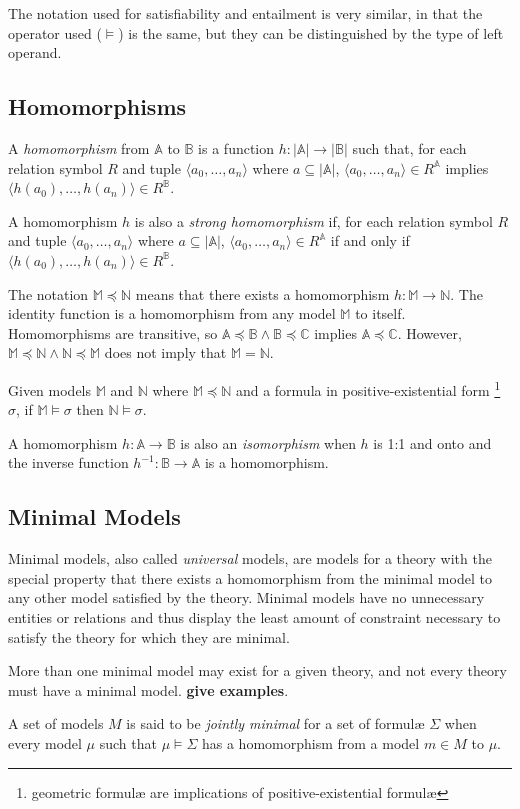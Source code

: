 		The notation used for satisfiability and entailment is very similar, in
		that the operator used ($\models$) is the same, but they can be
		distinguished by the type of left operand.

	\subsection{Homomorphisms}

		A \emph{homomorphism} from $\mathbb{A}$ to $\mathbb{B}$ is a function
		$h: |\mathbb{A}|\to|\mathbb{B}|$ such that, for each relation symbol
		$R$ and tuple $\langle a_0 , \ldots , a_n \rangle$ where $a \subseteq
		|\mathbb{A}|$, $\langle a_0 , \ldots , a_n  \rangle \in R^\mathbb{A}$
		implies $\langle h(a_0) , \ldots , h(a_n) \rangle \in R^\mathbb{B}$.

		A homomorphism $h$ is also a \emph{strong homomorphism} if, for each
		relation symbol $R$ and tuple $\langle a_0 , \ldots , a_n \rangle$
		where $a \subseteq |\mathbb{A}|$, $\langle a_0 , \ldots , a_n  \rangle
		\in R^\mathbb{A}$ if and only if $\langle h(a_0) , \ldots , h(a_n)
		\rangle \in R^\mathbb{B}$.

		The notation $\mathbb{M} \preceq \mathbb{N}$ means that there exists a
		homomorphism $h : \mathbb{M} \to \mathbb{N}$. The identity function is
		a homomorphism from any model $\mathbb{M}$ to itself.  Homomorphisms
		are transitive, so $\mathbb{A} \preceq \mathbb{B} \wedge \mathbb{B}
		\preceq \mathbb{C}$ implies $\mathbb{A} \preceq \mathbb{C}$. However,
		$\mathbb{M} \preceq \mathbb{N} \wedge \mathbb{N} \preceq \mathbb{M}$
		does not imply that $\mathbb{M} = \mathbb{N}$.

		Given models $\mathbb{M}$ and $\mathbb{N}$ where $\mathbb{M} \preceq
		\mathbb{N}$ and a formula in positive-existential form
		\footnote{geometric formul{\ae} are implications of positive-existential
		formul{\ae}} $\sigma$, if $\mathbb{M} \models \sigma$ then $\mathbb{N}
		\models \sigma$.

		A homomorphism $h : \mathbb{A} \to \mathbb{B}$ is also an
		\emph{isomorphism} when $h$ is 1:1 and onto and the inverse function
		$h^{-1} : \mathbb{B} \to \mathbb{A}$ is a homomorphism.

	\subsection{Minimal Models}

		Minimal models, also called \emph{universal} models, are models for a
		theory with the special property that there exists a homomorphism from
		the minimal model to any other model satisfied by the theory. Minimal
		models have no unnecessary entities or relations and thus display the
		least amount of constraint necessary to satisfy the theory for which
		they are minimal.

		More than one minimal model may exist for a given theory, and not every
		theory must have a minimal model. \textbf{give examples}.

		A set of models $M$ is said to be \emph{jointly minimal} for a set of
		formul{\ae} $\Sigma$ when every model $\mu$ such that $\mu \models
		\Sigma$ has a homomorphism from a model $m \in M$ to $\mu$.
